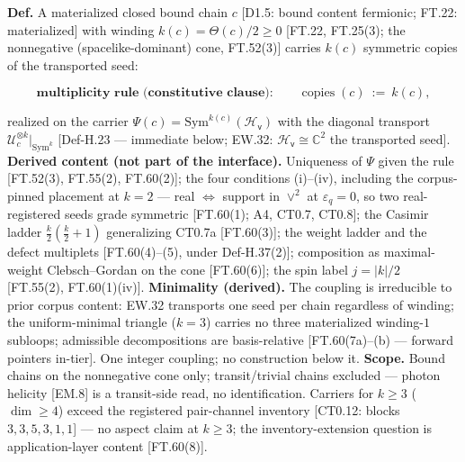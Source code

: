 \begin{definition}\label{tag:Def-H-38}
\textbf{Def.} A materialized closed bound chain $c$ [D1.5: bound content fermionic; FT.22: materialized] with winding $k(c)=\Theta(c)/2\ge0$ [FT.22, FT.25(3); the nonnegative (spacelike-dominant) cone, FT.52(3)] carries $k(c)$ symmetric copies of the transported seed:

\[
\textbf{multiplicity rule (constitutive clause):}\qquad \operatorname{copies}(c)\ :=\ k(c),
\]

realized on the carrier $\Psi(c)=\mathrm{Sym}^{k(c)}(\mathcal H_{\mathsf v})$ with the diagonal transport $\mathcal U_c^{\otimes k}\big|_{\mathrm{Sym}^k}$ [Def-H.23 — immediate below; EW.32: $\mathcal H_{\mathsf v}\cong\mathbb C^2$ the transported seed]. \textbf{Derived content (not part of the interface).} Uniqueness of $\Psi$ given the rule [FT.52(3), FT.55(2), FT.60(2)]; the four conditions (i)–(iv), including the corpus-pinned placement at $k{=}2$ — real $\iff$ support in $\vee^2$ at $\varepsilon_q=0$, so two real-registered seeds grade symmetric [FT.60(1); A4, CT0.7, CT0.8]; the Casimir ladder $\tfrac k2(\tfrac k2{+}1)$ generalizing CT0.7a [FT.60(3)]; the weight ladder and the defect multiplets [FT.60(4)–(5), under Def-H.37(2)]; composition as maximal-weight Clebsch–Gordan on the cone [FT.60(6)]; the spin label $j=|k|/2$ [FT.55(2), FT.60(1)(iv)]. \textbf{Minimality (derived).} The coupling is irreducible to prior corpus content: EW.32 transports one seed per chain regardless of winding; the uniform-minimal triangle ($k=3$) carries no three materialized winding-$1$ subloops; admissible decompositions are basis-relative [FT.60(7a)–(b) — forward pointers in-tier]. One integer coupling; no construction below it. \textbf{Scope.} Bound chains on the nonnegative cone only; transit/trivial chains excluded — photon helicity [EM.8] is a transit-side read, no identification. Carriers for $k\ge3$ ($\dim\ge4$) exceed the registered pair-channel inventory [CT0.12: blocks $3,3,5,3,1,1$] — no aspect claim at $k\ge3$; the inventory-extension question is application-layer content [FT.60(8)].

\end{definition}

